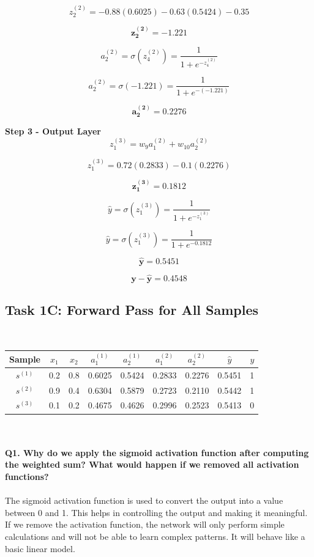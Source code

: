 \documentclass[runningheads]{llncs}
\begin{document}
\[
z_2^{(2)} = -0.88(0.6025) - 0.63(0.5424) - 0.35 
\]

\[
\mathbf{z_2^{(2)} = -1.221}
\]

\[
a_2^{(2)} = \sigma(z_4^{(2)}) = \frac{1}{1 + e^{-z_4^{(2)}}}
\]

\[
a_2^{(2)} = \sigma(-1.221) = \frac{1}{1 + e^{-(-1.221)}} 
\]

\[
\mathbf{a_2^{(2)} = 0.2276}
\]


                
\textbf{Step 3 - Output Layer\\}
\[
z_1^{(3)} = w_9 a_1^{(2)} + w_{10}  a_2^{(2)} 
\]

\[
z_1^{(3)} = 0.72(0.2833) - 0.1(0.2276) 
\]

\[
\mathbf{z_1^{(3)} = 0.1812}
\]

\[
\hat{y} = \sigma(z_1^{(3)}) = \frac{1}{1 + e^{-z_1^{(3)}}}
\]

\[
\hat{y} = \sigma(z_1^{(3)}) = \frac{1}{1 + e^{-0.1812}}
\]

\[
\mathbf{\hat{y} = 0.5451}
\]

\[
\mathbf{y-\hat{y} = 0.4548}
\]

\subsection{Task 1C: Forward Pass for All Samples}
\\
\renewcommand{\arraystretch}{2}

\begin{center}
\begin{tabular}{|c|c|c|c|c|c|c|c|c|}
\hline
\textbf{Sample} & \textbf{$x_1$} & \textbf{$x_2$} & \textbf{$a_1^{(1)}$} & \textbf{$a_2^{(1)}$} & \textbf{$a_1^{(2)}$} & \textbf{$a_2^{(2)}$} & \textbf{$\hat{y}$} & \textbf{$y$} \\
\hline
$s^{(1)}$ & 0.2 & 0.8 & 0.6025 & 0.5424 & 0.2833 & 0.2276 & 0.5451 & 1\\
\hline
$s^{(2)}$ & 0.9 & 0.4 & 0.6304 & 0.5879 & 0.2723 & 0.2110 & 0.5442 & 1\\
\hline
$s^{(3)}$ & 0.1 & 0.2 & 0.4675 & 0.4626 & 0.2996 & 0.2523 & 0.5413 & 0 \\
\hline
\end{tabular}
\end{center}
\\ \\

\textbf{Q1. Why do we apply the sigmoid activation function after computing the weighted sum? What would happen if we removed all activation functions?} 
\\ \\
The sigmoid activation function is used to convert the output into a value between 0 and 1. This helps in controlling the output and making it meaningful. If we remove the activation function, the network will only perform simple calculations 
and will not be able to learn complex patterns. It will behave like a basic linear model.
\end{document}
